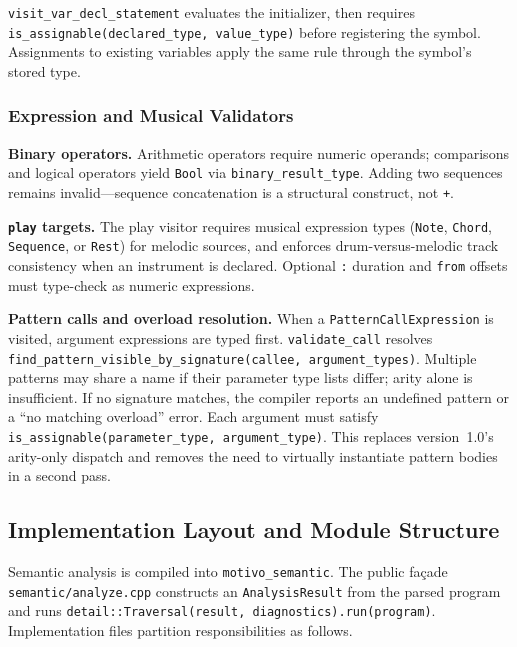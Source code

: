 \texttt{visit\_var\_decl\_statement} evaluates the initializer, then requires \texttt{is\_assignable(declared\_type,
value\_type)} before registering the symbol.
Assignments to existing variables apply the same rule through the symbol's stored type.

\subsubsection{Expression and Musical Validators}

\noindent \textbf{Binary operators.} Arithmetic operators require numeric operands; comparisons and logical operators
yield \texttt{Bool} via \texttt{binary\_result\_type}.
Adding two sequences remains invalid---sequence concatenation is a structural construct, not \texttt{+}.

\noindent \textbf{\texttt{play} targets.} The play visitor requires musical expression types (\texttt{Note},
\texttt{Chord}, \texttt{Sequence}, or \texttt{Rest}) for melodic sources, and enforces drum-versus-melodic track
consistency when an instrument is declared.
Optional \texttt{:} duration and \texttt{from} offsets must type-check as numeric expressions.

\noindent \textbf{Pattern calls and overload resolution.} When a \texttt{PatternCallExpression} is visited, argument
expressions are typed first.
\texttt{validate\_call} resolves \texttt{find\_pattern\_visible\_by\_signature(callee, argument\_types)}.
Multiple patterns may share a name if their parameter type lists differ; arity alone is insufficient.
If no signature matches, the compiler reports an undefined pattern or a ``no matching overload'' error.
Each argument must satisfy \texttt{is\_assignable(parameter\_type, argument\_type)}.
This replaces version~1.0's arity-only dispatch and removes the need to virtually instantiate pattern bodies in a
second pass.

\subsection{Implementation Layout and Module Structure}\label{detail-subsec:semantic-implementation-layout}

Semantic analysis is compiled into \texttt{motivo\_semantic}.
The public façade \texttt{semantic/analyze.cpp} constructs an \texttt{AnalysisResult} from the parsed program and
runs \texttt{detail::Traversal(result, diagnostics).run(program)}.
Implementation files partition responsibilities as follows.

